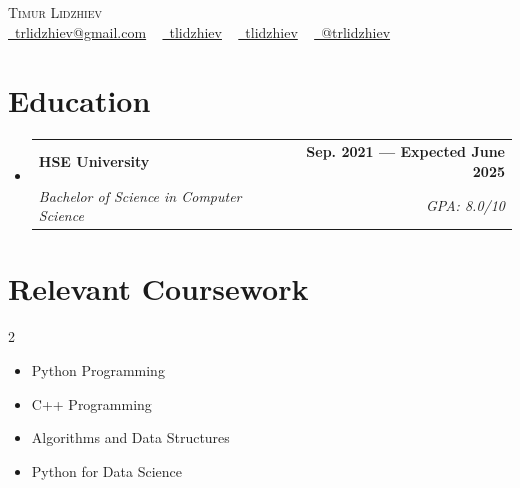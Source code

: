 \documentclass[letterpaper,11pt]{article}
\makeatletter
\newcommand{\resumeSubheading}[4]{
  \vspace{-2pt}\item
    \begin{tabular*}{1.0\textwidth}[t]{l@{\extracolsep{\fill}}r}
      \textbf{#1} & \textbf{\small #2} \\
      \textit{\small#3} & \textit{\small #4} \\
    \end{tabular*}\vspace{-7pt}
}
\newcommand{\resumeSubHeadingListStart}{\begin{itemize}[leftmargin=0.0in, label={}]}
\newcommand{\resumeSubHeadingListEnd}{\end{itemize}}
\makeatother
\begin{document}

\begin{center}
    {\Huge \scshape Timur Lidzhiev} \\ \vspace{1pt}
     \href{mailto:x@gmail.com}{\raisebox{-0.2\height}\faEnvelope\  trlidzhiev@gmail.com} ~
    \href{https://linkedin.com/in/tlidzhiev}{\raisebox{-0.2\height}\faLinkedin\ tlidzhiev}  ~
    \href{https://github.com/tlidzhiev}{\raisebox{-0.2\height}\faGithub\ tlidzhiev} ~ \href{https://t.me/trlidzhiev}{\raisebox{-0.05\height}\faTelegram \ @trlidzhiev}
    \vspace{-8pt}
\end{center}


\section{Education}
  \resumeSubHeadingListStart
    \resumeSubheading
      {HSE University}{Sep. 2021 --- Expected June 2025}
      {Bachelor of Science in Computer Science}{GPA: 8.0/10}
  \resumeSubHeadingListEnd

\section{Relevant Coursework}
        \begin{multicols}{2}
            \begin{itemize}[itemsep=-5pt, parsep=3pt]
                \item Python Programming
                \item C++ Programming
                \item Algorithms and Data Structures
                \item Python for Data Science
            \end{itemize}
        \end{multicols}
        \vspace*{2.0\multicolsep}
\end{document}
